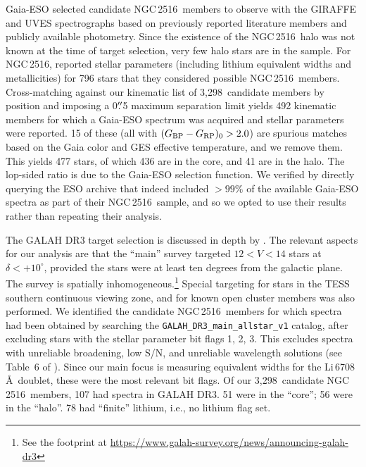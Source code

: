 \documentclass[12pt,twocolumn,tighten]{aastex63}
\newcommand{\cn}{NGC\,2516} %
\newcommand{\nkinematic}{3{,}298} %
\newcommand{\bpmrpo}{(G_{\rm BP}-G_{\rm RP})_0}
\begin{document}
Gaia-ESO selected candidate \cn\ members to observe with the GIRAFFE
and UVES spectrographs based on previously reported literature members
and publicly available photometry.  Since the existence of the \cn\
halo was not known at the time of target selection, very few halo
stars are in the sample.  For \cn, \citet{randich_gaiaeso_2018}
reported stellar parameters (including lithium equivalent
widths and metallicities) for 796 stars that they considered possible
\cn\ members.  Cross-matching against our kinematic list of
\nkinematic\ candidate members by position and imposing a 0$\mbox{$.\!\!^{\prime\prime}$}$5
maximum separation limit yields 492 kinematic members for which a
Gaia-ESO spectrum was acquired and stellar parameters were reported.
15 of these (all with $\bpmrpo > 2.0$) are spurious matches based on
the Gaia color and GES effective temperature, and we remove them.
This yields 477 stars, of which 436 are in the core, and 41 are in the
halo.  The lop-sided ratio is due to the Gaia-ESO selection function.
We verified by directly querying the ESO archive that
\citet{randich_gaiaeso_2018} indeed included $>99\%$ of the available
Gaia-ESO spectra as part of their \cn\ sample, and so we opted to use
their results rather than repeating their analysis.

The GALAH DR3 target selection is discussed in depth by
\citet{buder_galah_2020}.  The relevant aspects for our analysis are
that the ``main'' survey targeted $12<V<14$ stars at
$\delta<+10^\circ$, provided the stars were at least ten degrees from
the galactic plane.  The survey is spatially
inhomogeneous.\footnote{See the footprint at
\url{https://www.galah-survey.org/news/announcing-galah-dr3}} Special
targeting for stars in the TESS southern continuous viewing zone, and
for known open cluster members was also performed.  We identified the
candidate \cn\ members for which spectra had been obtained by
searching the \texttt{GALAH\_DR3\_main\_allstar\_v1} catalog, after
excluding stars with the stellar parameter bit flags 1, 2, 3.  This
excludes spectra with unreliable broadening, low S/N, and unreliable
wavelength solutions (see Table~6 of \citealt{buder_galah_2020}).
Since our main focus is measuring equivalent widths for the
Li\,6708\,\AA\ doublet, these were the most relevant bit flags.  Of
our \nkinematic\ candidate \cn\ members, 107 had spectra in GALAH DR3.
51 were in the ``core''; 56 were in the ``halo''.  78 had ``finite''
lithium, i.e., no lithium flag set.

%
%
\end{document}
